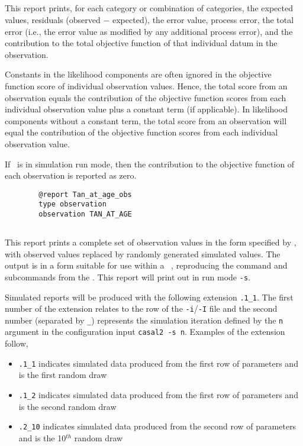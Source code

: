 \subsection{}\label{sec:Report-Observation}

This report prints, for each category or combination of categories, the expected values, residuals (observed $-$ expected), the error value, process error, the total error (i.e., the error value as modified by any additional process error), and the contribution to the total objective function of that individual datum in the observation.

Constants in the likelihood components are often ignored in the objective function score of individual observation values. Hence, the total score from an observation equals the contribution of the objective function scores from each individual observation value plus a constant term (if applicable). In likelihood components without a constant term, the total score from an observation will equal the contribution of the objective function scores from each individual observation value.

If \CNAME\ is in simulation run mode, then the contribution to the objective function of each observation is reported as zero.

\begin{verbatim}
		@report Tan_at_age_obs
		type observation
		observation TAN_AT_AGE
\end{verbatim}

\subsection{}\label{sec:Report-SimulatedObservation}

This report prints a complete set of observation values in the form specified by , with observed values replaced by randomly generated simulated values. The output is in a form  suitable for use within a \CNAME\ \config, reproducing the command and subcommands from the \config. This report will print out in run mode \texttt{-s}.


Simulated reports will be produced with the following extension \texttt{.1\_1}. The first number of the extension relates to the row of the \texttt{-i}/\texttt{-I} file and the second number (separated by \texttt{\_}) represents the simulation iteration defined by the \texttt{n} argument in the configuration input \texttt{casal2 -s n}. Examples of the extension follow,
\begin{itemize}
	\item \texttt{.1\_1} indicates simulated data produced from the first row of parameters and is the first random draw
	\item \texttt{.1\_2} indicates simulated data produced from the first row of parameters and is the second random draw
	\item \texttt{.2\_10} indicates simulated data produced from the second row of parameters and is the 10\(^{th}\) random draw
\end{itemize}
